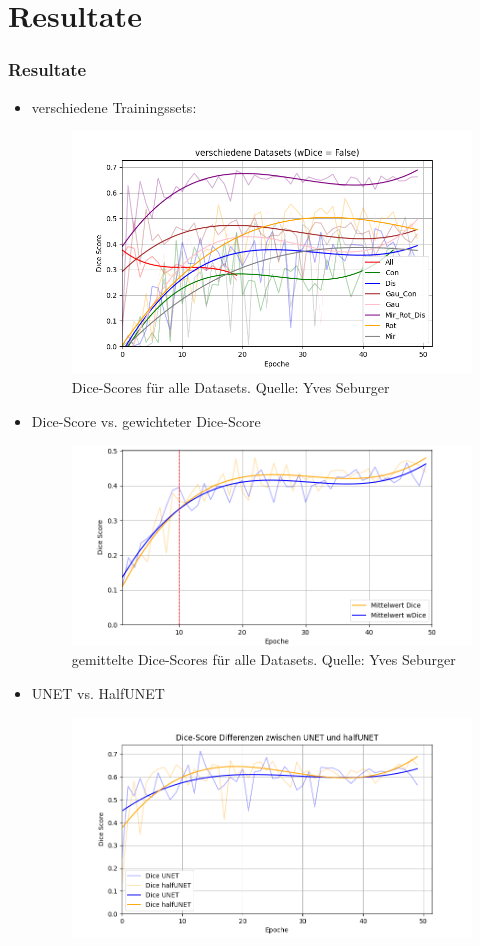 \documentclass{beamer}
\begin{document}
\section{Resultate}
\begin{frame}[allowframebreaks]
\frametitle{Resultate}
\begin{itemize}
    \item verschiedene Trainingssets:
    \begin{figure}
        \includegraphics[width=0.85\linewidth]{Bilder/alle_Sets_false_trans.png}
        \caption{Dice-Scores für alle Datasets. \scriptsize{Quelle: Yves Seburger}}
    \end{figure}
    \framebreak
    \item Dice-Score vs. gewichteter Dice-Score
    \begin{figure}
        \includegraphics[width=0.95\linewidth]{Bilder/alle_Sets_true_vs_false.png}
        \caption{gemittelte Dice-Scores für alle Datasets. \scriptsize{Quelle: Yves Seburger}}
    \end{figure}
    \item UNET vs. HalfUNET
    \begin{figure}
        \includegraphics[width=0.85\linewidth]{Bilder/UNET_vs_halfUNET.png}

\end{figure}
\end{itemize}
\end{frame}
\end{document}
